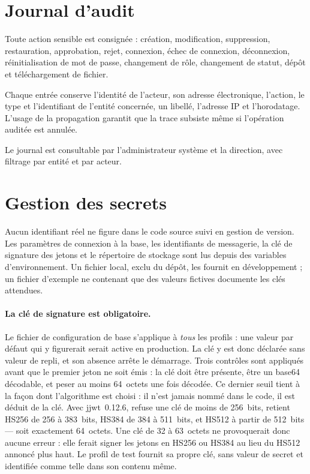 \section{Journal d'audit}

Toute action sensible est consignée : création, modification, suppression, restauration,
approbation, rejet, connexion, échec de connexion, déconnexion, réinitialisation de mot de
passe, changement de rôle, changement de statut, dépôt et téléchargement de fichier.

Chaque entrée conserve l'identité de l'acteur, son adresse électronique, l'action, le type
et l'identifiant de l'entité concernée, un libellé, l'adresse IP et l'horodatage. L'usage
de la propagation  garantit que la trace subsiste même si l'opération
auditée est annulée.

Le journal est consultable par l'administrateur système et la direction, avec filtrage par
entité et par acteur.

\section{Gestion des secrets}

Aucun identifiant réel ne figure dans le code source suivi en gestion de version. Les
paramètres de connexion à la base, les identifiants de messagerie, la clé de signature
des jetons et le répertoire de stockage sont lus depuis des variables d'environnement. Un
fichier local, exclu du dépôt, les fournit en développement ; un fichier d'exemple ne
contenant que des valeurs fictives documente les clés attendues.

\paragraph{La clé de signature est obligatoire.} Le fichier de configuration de base
s'applique à \emph{tous} les profils : une valeur par défaut qui y figurerait serait
active en production. La clé y est donc déclarée sans valeur de repli, et son absence
arrête le démarrage. Trois contrôles sont appliqués avant que le premier jeton ne soit
émis : la clé doit être présente, être un base64 décodable, et peser au moins 64~octets
une fois décodée. Ce dernier seuil tient à la façon dont l'algorithme est choisi : il
n'est jamais nommé dans le code, il est déduit de la clé. Avec jjwt~0.12.6,
 refuse une clé de moins de 256~bits, retient HS256 de 256 à
383~bits, HS384 de 384 à 511~bits, et HS512 à partir de 512~bits --- soit exactement
64~octets. Une clé de 32 à 63~octets ne provoquerait donc aucune erreur : elle ferait
signer les jetons en HS256 ou HS384 au lieu du HS512 annoncé plus haut. Le profil de test fournit
sa propre clé, sans valeur de secret et identifiée comme telle dans son contenu même.

